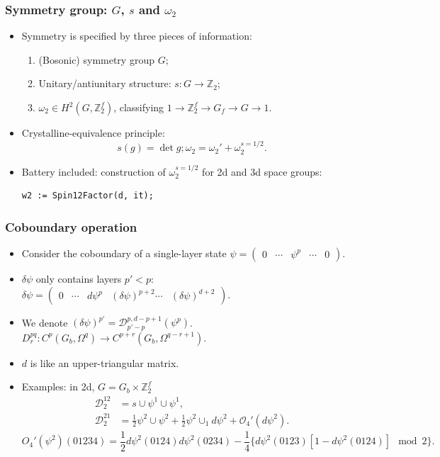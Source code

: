 \documentclass[xcolor=table, aspectratio=169]{beamer}
\begin{document}
\begin{frame}[fragile]
  \frametitle{Symmetry group: $G$, $s$ and $\omega_2$}
  \begin{itemize}
  \item Symmetry is specified by three pieces of information:
    \begin{enumerate}
    \item (Bosonic) symmetry group $G$;
    \item Unitary/antiunitary structure: $s:G\rightarrow \mathbb Z_2$;
    \item $\omega_2\in H^2(G, \mathbb Z_2^f)$, classifying $1\rightarrow\mathbb Z_2^f\rightarrow G_f\rightarrow G\rightarrow1$.
    \end{enumerate}
  \item Crystalline-equivalence principle:
    \[s(g) = \det g; \omega_2 = \omega_2' + \omega_2^{s=1/2}.\]
  \item Battery included: construction of $\omega_2^{s=1/2}$ for 2d and 3d space groups:
    \begin{lstlisting}[basicstyle=\footnotesize]
      w2 := Spin12Factor(d, it);
    \end{lstlisting}
  \end{itemize}
\end{frame}

\begin{frame}
	\frametitle{Coboundary operation}
	\begin{itemize}
		\item Consider the coboundary of a single-layer state
		$\psi = \begin{pmatrix}0&\cdots&\psi^p&\cdots&0\end{pmatrix}$.
		\item $\delta\psi$ only contains layers $p'<p$:
		$\delta\psi=\begin{pmatrix}0&\cdots&d\psi^p&(\delta\psi)^{p+2}\cdots&(\delta\psi)^{d+2}\end{pmatrix}$.
		\item We denote $(\delta\psi)^{p'}=\mathcal D^{p, d-p+1}_{p'-p}(\psi^p)$.
		$D^{pq}_r:C^p(G_b,\Omega^q)\rightarrow C^{p+r}(G_b,\Omega^{q-r+1})$.
		\item $d$ is like an upper-triangular matrix.
		\item Examples: in 2d, $G=G_b\times\mathbb Z_2^f$
		\begin{align*}
			\mathcal D_2^{12} &= s\cup\psi^1\cup\psi^1,\\
		  \mathcal D_2^{21} &= \frac12\psi^2\cup\psi^2
		  +\frac12\psi^2\cup_1d\psi^2
		  +\mathcal O_4'(d\psi^2).
		\end{align*}
		\[  O_4'(\psi^2)(01234)
		  =\frac12d\psi^2(0124)d\psi^2(0234)
		  -\frac14\{d\psi^2(0123)[1-d\psi^2(0124)] \mod 2\}.\]
	\end{itemize}
\end{frame}
\end{document}
